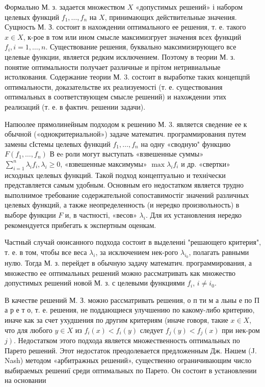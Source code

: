 \documentclass[10pt]{article}
\begin{document}
Формально М. з. задается множеством $X$ «допустимых решений» і набором целевых функций $f_{1}, \ldots, f_{n}$ на $X$, принимающих действительные значения. Сущность М. З. состоит в нахождении оптимального ее решения, т. е. такого $x \in X$, к-рое в том или ином смысле максимизгрует значения всех функций $f_{i}, i=1, \ldots, n$. Существование решения, буквально максимизирующего все целевые функции, является редким исключением. Поэтому в теории М. з. понятие оптимальности получает различные и прітом нетривиальные истолкования. Содержание теории М. 3. состоит в выработке таких концепцпй оптимальности, доказательстве их реализуемості (т. е. существования оптимальных в соответствующем смысле решений) и нахождении этих реализаций (т. е. в фактич. решении задачи).



Напюолее прямолинейным подходом к решению М. 3. является сведение ее к обычной («однокритериальной») задаче математич. программирования путем замены сІстемы целевых функций $f_{1}, \ldots, f_{n}$ на одну «сводную" функцию $F\left(f_{1}, \ldots, f_{n}\right)$ В еe роли могут выступать «взвешенные суммы» $\sum_{i=1}^{n} \lambda_{i} f_{i}, \lambda_{i} \geqslant 0$, «взвешенные максимумы» $\max \lambda_{i} f_{i}$ и др. «свертки» исходных целевых функций. Такой подход концептуально и технічески представляется самым удобным. Основным его недостатком является трудно выполнимое требование содержательной сопоставимостіг значений различных целевых функций, а также неопределенность (и нередко произвольность) в выборе функции $F$ и, в частності, «весов» $\lambda_{i}$. Для их установления нередко рекомендуется прибегать к экспертным оценкам.



Частный случай оюисанного подхода состоит в выделениі "решающего критерия", т. е. в том, чтобы все веса $\lambda_{i}$, за исключением нек-рого $\lambda_{i_{0}}$, полагать равными нулю. Тогда М. з. перейдет в обычную задачу математич. программирования, а множество ее оптимальных решений можно рассматривать как множество допустимых решений новой М. з. с целевыми функциями $f_{i}$, $i \neq i_{0}$.



В качестве решений М. З. можно рассматривать решения, о п ти м а льны е по П а р е т о, т. е. решения, не поддающиеся улучшению по какому-либо критерию, иначе как за счет ухудшения по другим критериям (иначе говоря, такие $x \in X$, что для любого $y \in X$ из $f_{i}(x)<f_{i}(y)$ следует $f_{j}(y)<f_{j}(x)$ при нек-ром $\left.j\right)$. Недостатком этого подхода является множественность оптимальных по Парето решений. Этот недостаток преодолевается предложенным Дж. Нәшем (J. Nash) методом «арбитражных решений», существенно ограничивающим число выбираемых решениї среди оптимальных по Парето. Он состоит в установлении на основании
\end{document}
